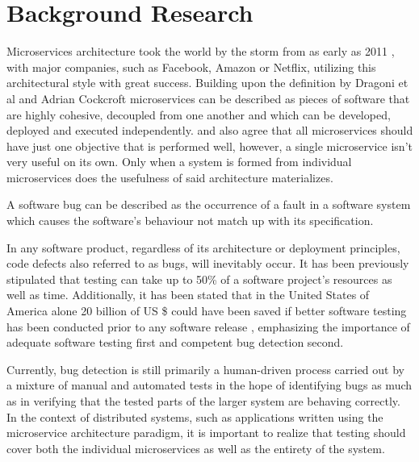 \chapter{Background Research}\label{chp:background-research}
Microservices architecture took the world by the storm from as early as 2011 \cite{fowlerOnMicroservices}, with major companies, such as Facebook, Amazon or Netflix, utilizing this architectural style with great success.
Building upon the definition by Dragoni et al \cite{dragoniOnMs} and Adrian Cockcroft \cite{understandingOfMicroservices} microservices can be described as pieces of software that are highly cohesive, decoupled from one another and which can be developed, deployed and executed independently. \cite{dragoniOnMs} and \cite{understandingOfMicroservices} also agree that all microservices should have just one objective that is performed well, however, a single microservice isn't very useful on its own. Only when a system is formed from individual microservices does the usefulness of said architecture materializes.

A software bug can be described as the occurrence of a fault in a software system which causes the software's behaviour not match up with its specification\cite{predicting-severity-of-a-bug}.
  
In any software product, regardless of its architecture or deployment principles, code defects also referred to as bugs, will inevitably occur. It has been previously stipulated that testing can take up to 50\% of a software project's resources as well as time. Additionally, it has been stated that in the United States of America alone 20 billion of US \$ could have been saved if better software testing has been conducted prior to any software release \cite{auto-bug-fixing}, emphasizing the importance of adequate software testing first and competent bug detection second.

Currently, bug detection is still primarily a human-driven process carried out by a mixture of manual and automated tests in the hope of identifying bugs as much as in verifying that the tested parts of the larger system are behaving correctly. 
In the context of distributed systems, such as applications written using the microservice architecture paradigm, it is important to realize that testing should cover both the individual microservices as well as the entirety of the system.

